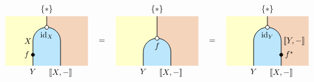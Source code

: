 \[
 \begin{tikzpicture}[x=0.6cm,y=0.6cm,line width=0.7pt,hollow/.style={
            circle,
            fill=white,
            draw,
            outer sep=0pt,
            inner sep=1.7pt,
            line width=0.7pt
          }]
    \definecolor{leftcolor}{RGB}{255,255,204}
    \definecolor{midcolor}{HTML}{BBE6FB}
    \definecolor{rightcolor}{HTML}{F5D4BC}

    \node at (4, 1.8) {$=$};
    \node at (12, 1.8) {$=$};
    
    \begin{scope}
        \begin{scope} 
            \clip (-3,0) rectangle (3,3.6);     
            \fill[fill=leftcolor] (-3,0) rectangle (0, 4);  
            \fill[fill=rightcolor] (0,0) rectangle (3, 4);  
            \draw[fill=midcolor, rounded corners=0.6cm, line width=0.7pt] (-1, -2) rectangle (1, 2.8);
        \end{scope}
        \draw (0, 3.6) -- (0,2.8);
        \filldraw [black] (-1,0.8) circle (2pt) node[left=1pt] {$f$};
        \node[below] at (-1, 0) {$Y$};
        \node[left=-2pt] at (-1, 1.8) {$X$};
        \node[below] at (1, 0) {$\llbracket X , -\rrbracket$};
        \node[hollow] at (0, 2.8) {};
        \node[below=2pt] at (0, 2.8) {$\mathrm{id}_X$}; 
        \node[above] at (0, 3.6) {$\{*\}$};
    \end{scope}
    
    \begin{scope}[shift={(8,0)}]
        \begin{scope} 
            \clip (-3,0) rectangle (3,3.6);     
            \fill[fill=leftcolor] (-3,0) rectangle (0, 4);  
            \fill[fill=rightcolor] (0,0) rectangle (3, 4);  
            \draw[fill=midcolor, rounded corners=0.6cm, line width=0.7pt] (-1, -2) rectangle (1, 2);
        \end{scope}
        \draw (0, 3.6) -- (0,2);
        \node[below] at (-1, 0) {$Y$};
        \node[below] at (1, 0) {$\llbracket X , -\rrbracket$};
        \node[hollow] at (0, 2) {};
        \node[below=2pt] at (0, 2) {$f$}; 
        \node[above] at (0, 3.6) {$\{*\}$};
    \end{scope}
    
     \begin{scope}[shift={(16,0)}]
        \begin{scope} 
            \clip (-3,0) rectangle (3, 3.6);     
            \fill[fill=leftcolor] (-3,0) rectangle (0, 4);  
            \fill[fill=rightcolor] (0,0) rectangle (3, 4);  
            \draw[fill=midcolor, rounded corners=0.6cm, line width=0.7pt] (-1, -2) rectangle (1, 2.8);
        \end{scope}
        \draw (0, 3.6) -- (0,2.8);
        \filldraw [black] (1,0.8) circle (2pt) node[right=1pt] {$f^\star$};
        \node[below] at (-1, 0) {$Y$};
        \node[right=-1pt] at (1, 1.8) {$\llbracket Y , -\rrbracket$};
        \node[below] at (1, 0) {$\llbracket X , -\rrbracket$};
        \node[hollow] at (0, 2.8) {};
        \node[below=2pt] at (0, 2.8) {$\mathrm{id}_Y$}; 
        \node[above] at (0, 3.6) {$\{*\}$};
    \end{scope}
    
    \end{tikzpicture}
\]
